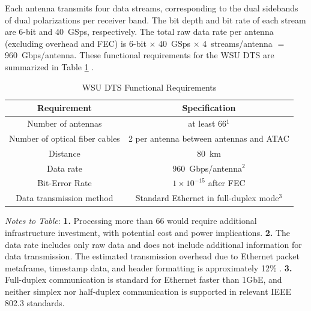 Each antenna transmits four data streams, corresponding to the dual sidebands of dual polarizations per receiver band.
The bit depth and bit rate of each stream are 6-bit and 40~GSps, respectively.
The total raw data rate per antenna (excluding overhead and \ac{FEC}) is 6-bit $\times$ 40~GSps $\times$ 4~streams/antenna $=$ 960~Gbps/antenna.
These functional requirements for the \ac{WSU} \ac{DTS} are summarized in Table \ref{tab:dts_req} \cite{dts_pdr_dsn}.

\begin{table}[h!]
    \centering
    \caption{\acs{WSU} \acs{DTS} Functional Requirements}
    \begin{tabular}{cc}
         \hline
         Requirement & Specification \\
         \hline
         Number of antennas & at least 66$^1$\\
         Number of optical fiber cables & 2 per antenna between antennas and \ac{ATAC} \\
         Distance& 80~km \\
         Data rate & 960~Gbps/antenna$^2$\\
         Bit-Error Rate & $1\times10^{-15}$ after \ac{FEC}\\
         Data transmission method& Standard Ethernet in full-duplex mode$^3$\\
         \hline
    \end{tabular}
    \begin{minipage}{\textwidth}
    \small
    \vspace*{0.5em}

     \textit{Notes to Table}: 
        \textbf{1.} Processing more than 66 would require additional infrastructure investment, with potential cost and power implications.
        \textbf{2.} The data rate includes only raw data and does not include additional information for data transmission.
        The estimated transmission overhead due to Ethernet packet metaframe, timestamp data, and header formatting is approximately 12\% \cite{atac_icd_dspot}.
        \textbf{3.} Full-duplex communication is standard for Ethernet faster than 1GbE, and neither simplex nor half-duplex communication is supported in relevant IEEE 802.3 standards.
    \end{minipage}
    \label{tab:dts_req}
\end{table}



